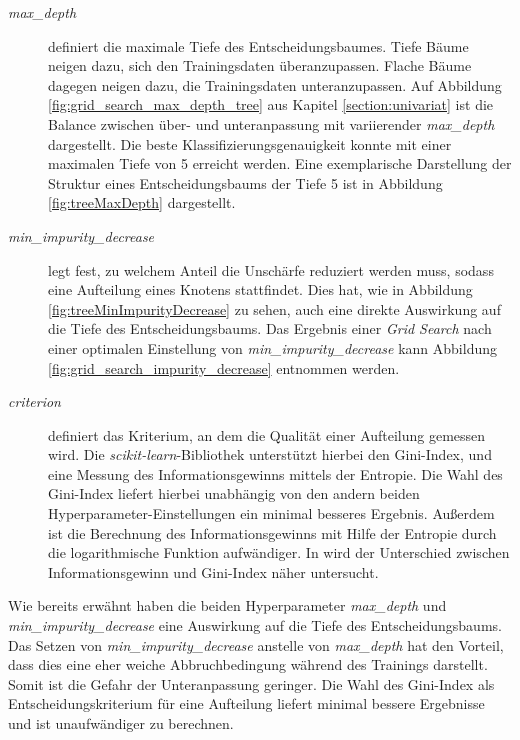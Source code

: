 \begin{description}
	\item[\emph{max\_depth}]
	 definiert die maximale Tiefe des Entscheidungsbaumes. Tiefe Bäume neigen dazu, sich den Trainingsdaten überanzupassen. Flache Bäume dagegen neigen dazu, die Trainingsdaten unteranzupassen. Auf Abbildung \ref{fig:grid_search_max_depth_tree} aus Kapitel \ref{section:univariat} ist die Balance zwischen über- und unteranpassung mit variierender \emph{max\_depth} dargestellt. Die beste Klassifizierungsgenauigkeit konnte mit einer maximalen Tiefe von 5 erreicht werden. Eine exemplarische Darstellung der Struktur eines Entscheidungsbaums der Tiefe 5 ist in Abbildung \ref{fig:treeMaxDepth} dargestellt.

	\item[\emph{min\_impurity\_decrease}] 
	legt fest, zu welchem Anteil die Unschärfe reduziert werden muss, sodass eine Aufteilung eines Knotens stattfindet. Dies hat, wie in Abbildung \ref{fig:treeMinImpurityDecrease} zu sehen, auch eine direkte Auswirkung auf die Tiefe des Entscheidungsbaums. Das Ergebnis einer \emph{Grid Search} nach einer optimalen Einstellung von \emph{min\_impurity\_decrease} kann Abbildung \ref{fig:grid_search_impurity_decrease} entnommen werden.
	
	\item[\emph{criterion}]
	definiert das Kriterium, an dem die Qualität einer Aufteilung gemessen wird. Die \emph{scikit-learn}-Bibliothek unterstützt hierbei den Gini-Index, und eine Messung des Informationsgewinns mittels der Entropie. Die Wahl des Gini-Index liefert hierbei unabhängig von den andern beiden Hyperparameter-Einstellungen ein minimal besseres Ergebnis. Außerdem ist die Berechnung des Informationsgewinns mit Hilfe der Entropie durch die logarithmische Funktion aufwändiger. In \cite{gini_entropy} wird der Unterschied zwischen Informationsgewinn und Gini-Index näher untersucht.
\end{description}

Wie bereits erwähnt haben die beiden Hyperparameter \emph{max\_depth} und \emph{min\_impurity\_decrease} eine Auswirkung auf die Tiefe des Entscheidungsbaums. Das Setzen von \emph{min\_impurity\_decrease} anstelle von  \emph{max\_depth} hat den Vorteil, dass dies eine eher weiche Abbruchbedingung während des Trainings darstellt. Somit ist die Gefahr der Unteranpassung geringer. Die Wahl des Gini-Index als Entscheidungskriterium für eine Aufteilung liefert minimal bessere Ergebnisse und ist unaufwändiger zu berechnen.


